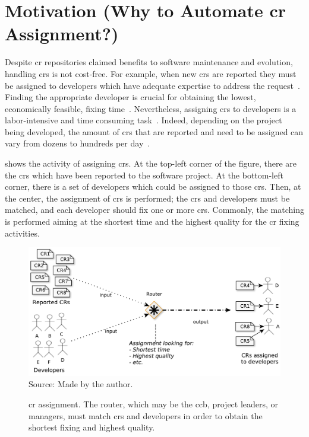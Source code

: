 {\section[Motivation  (Why to Automate CR Assignment?)]{Motivation (Why to
Automate \ac{cr} Assignment?)}

Despite \ac{cr} repositories claimed benefits to software maintenance and
evolution, handling \acp{cr} is not cost-free. For example, when new \acp{cr}
are reported they must be assigned to developers which have adequate expertise
to address the request~. Finding the
appropriate developer is crucial for obtaining the lowest, economically
feasible, fixing time~. Nevertheless, assigning \acp{cr} to
developers is a labor-intensive and time consuming
task~. Indeed, depending on the project being
developed, the amount of \acp{cr} that are reported and need to be assigned can
vary from dozens to hundreds per day~.

 shows the activity of assigning \acp{cr}.
At the top-left corner of the figure, there are the \acp{cr} which have been
reported to the software project. At the bottom-left corner, there is a set of
developers which could be assigned to those \acp{cr}. Then, at the center, the
assignment of \acp{cr} is performed; the \acp{cr} and developers must be
matched, and each developer should fix one or more \acp{cr}. Commonly, the
matching is performed aiming at the shortest time and the highest quality for
the \ac{cr} fixing activities.

\begin{figure}[htp]
\centering
  \caption[\ac{cr} assignment.]{\ac{cr} assignment. The router, which may be the
  \acs{ccb}, project leaders, or managers, must match \acp{cr} and developers in
  order to obtain the shortest fixing and highest quality.}
  \includegraphics[width=\columnwidth]{images/assignment-schema.pdf}
  \footnotesize{Source: Made by the author.}
  \label{fig:assignment-schema}
\end{figure}

}
